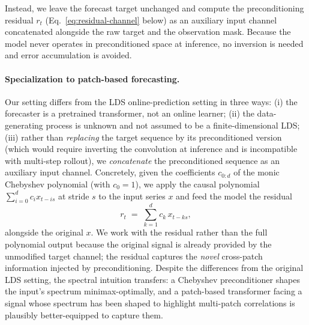 \documentclass[11pt]{article}
\theoremstyle{plain}
\theoremstyle{definition}
\theoremstyle{remark}
\begin{document}
Instead, we leave the forecast target unchanged and compute the preconditioning residual $r_t$ (Eq.~\ref{eq:residual-channel} below) as an auxiliary input channel concatenated alongside the raw target and the observation mask. Because the model never operates in preconditioned space at inference, no inversion is needed and error accumulation is avoided.

\paragraph{Specialization to patch-based forecasting.}
Our setting differs from the LDS online-prediction setting in three ways: (i) the forecaster is a pretrained transformer, not an online learner; (ii) the data-generating process is unknown and not assumed to be a finite-dimensional LDS; (iii) rather than \emph{replacing} the target sequence by its preconditioned version (which would require inverting the convolution at inference and is incompatible with multi-step rollout), we \emph{concatenate} the preconditioned sequence as an auxiliary input channel. Concretely, given the coefficients $c_{0:d}$ of the monic Chebyshev polynomial (with $c_0 = 1$), we apply the causal polynomial $\sum_{i=0}^{d} c_i x_{t-is}$ at stride $s$ to the input series $x$ and feed the model the residual
\begin{equation}
    r_t \;=\; \sum_{k=1}^{d} c_k\, x_{t-ks},
    \label{eq:residual-channel}
\end{equation}
alongside the original $x$. We work with the residual rather than the full polynomial output because the original signal is already provided by the unmodified target channel; the residual captures the \emph{novel} cross-patch information injected by preconditioning. Despite the differences from the original LDS setting, the spectral intuition transfers: a Chebyshev preconditioner shapes the input's spectrum minimax-optimally, and a patch-based transformer facing a signal whose spectrum has been shaped to highlight multi-patch correlations is plausibly better-equipped to capture them.
\end{document}
